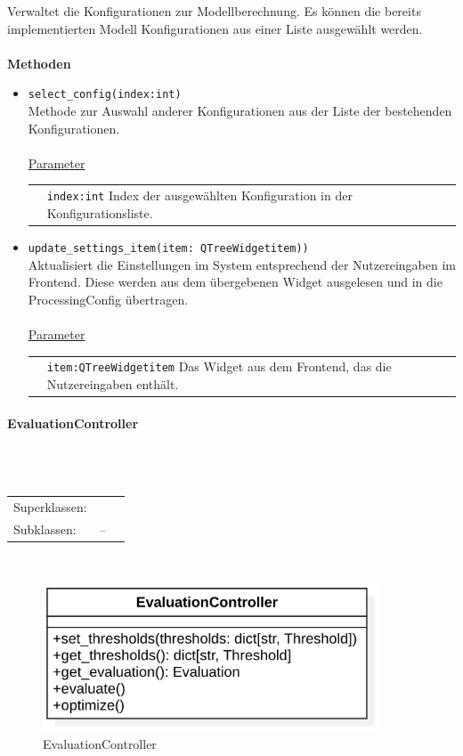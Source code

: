 \documentclass{article}
\newcommand{\classheader}[2][]{\paragraph{#2}
\mbox{}\textit{#1}\\\\}
\newcommand{\classref}[1]{\texttt{\nameref{cls:#1}}}
\begin{document}
Verwaltet die Konfigurationen zur Modellberechnung. Es können die bereits implementierten Modell Konfigurationen aus einer Liste ausgewählt werden. \\\\
\textbf{\large{Methoden}}
\begin{itemize}
\item \texttt{select\_config(index:int)}\\ Methode zur Auswahl anderer Konfigurationen aus der Liste der bestehenden Konfigurationen.\\\\
\underline{{Parameter}}\\
\begin{tabular}{lp{10.7cm}}
 & \texttt{index:int} Index der ausgewählten Konfiguration in der Konfigurationsliste. \\
\end{tabular}
\item \texttt{update\_settings\_item(item: QTreeWidgetitem))}\\ Aktualisiert die Einstellungen im System entsprechend der Nutzereingaben im Frontend. Diese werden aus dem übergebenen Widget ausgelesen und in die ProcessingConfig übertragen.\\\\
\underline{{Parameter}}\\
\begin{tabular}{lp{10.7cm}}
 & \texttt{item:QTreeWidgetitem} Das Widget aus dem Frontend, das die Nutzereingaben enthält. \\
\end{tabular}
\end{itemize}


\newpage
\classheader{EvaluationController}\label{cls:EvaluationController}
\begin{tabular}{lll}
 Superklassen: & \classref{AbstractController}\\
 Subklassen: & --
\end{tabular}\\
\begin{figure}[H]%
    \centering
    \includegraphics[width=10cm]{entwurf/Floriane/EvaluationController.png}
    \caption{EvaluationController}
\end{figure}
\end{document}

